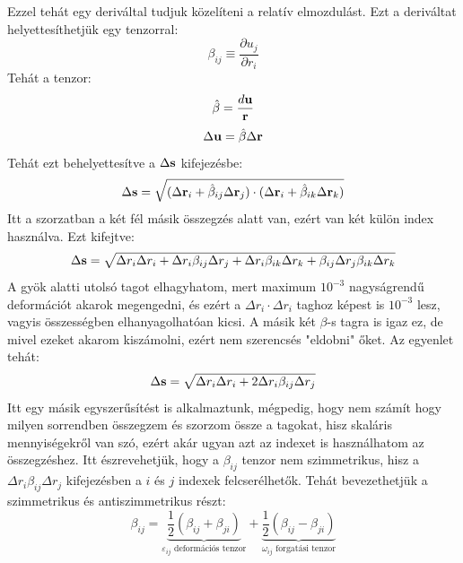 \documentclass[a4paper,12pt]{article}
\begin{document}
Ezzel tehát egy deriváltal tudjuk közelíteni a relatív elmozdulást. Ezt a deriváltat helyettesíthetjük egy tenzorral:
\begin{equation}
    \beta_{ij} \equiv \frac{\partial u_j}{\partial r_i}
\end{equation}
Tehát a tenzor:
\begin{equation}
    \hat{\beta} = \frac{d\bold{u}}{\bold{r}}
\end{equation}
\begin{equation}
    \Delta \bold{u} = \hat{\beta} \Delta \bold{r}
\end{equation}
Tehát ezt behelyettesítve a $\Delta \bold{s}$ kifejezésbe:
\begin{equation}
    \Delta \bold{s} = \sqrt{(\Delta \bold{r}_i + \hat{\beta}_{ij} \Delta \bold{r}_j) \cdot (\Delta \bold{r}_i + \hat{\beta}_{ik} \Delta \bold{r}_k)}
\end{equation}
Itt a szorzatban a két fél másik összegzés alatt van, ezért van két külön index használva. Ezt kifejtve:
\begin{equation}
    \Delta \bold{s} = \sqrt{\Delta r_i \Delta r_i + \Delta r_i \beta_{ij} \Delta r_j + \Delta r_i \beta_{ik} \Delta r_k + \beta_{ij} \Delta r_j \beta_{ik} \Delta r_k}
\end{equation}
A gyök alatti utolsó tagot elhagyhatom, mert maximum $10^{-3}$ nagyságrendű deformációt akarok megengedni, és ezért a $\Delta r_i \cdot \Delta r_i$ taghoz képest is
$10^{-3}$ lesz, vagyis összességben elhanyagolhatóan kicsi. A másik két $\beta$-s tagra is igaz ez, de mivel ezeket akarom kiszámolni, ezért nem szerencsés "eldobni" őket.
Az egyenlet tehát:
\begin{equation}
    \Delta \bold{s} = \sqrt{\Delta r_i \Delta r_i + 2 \Delta r_i \beta_{ij} \Delta r_j}
\end{equation}
Itt egy másik egyszerűsítést is alkalmaztunk, mégpedig, hogy nem számít hogy milyen sorrendben összegzem és szorzom össze a tagokat, hisz skaláris mennyiségekről van szó,
ezért akár ugyan azt az indexet is használhatom az összegzéshez. Itt észrevehetjük, hogy a $\beta_{ij}$ tenzor nem szimmetrikus, hisz a $\Delta r_i \beta_{ij} \Delta r_j$ kifejezésben a $i$ és $j$ indexek felcserélhetők. Tehát bevezethetjük a szimmetrikus és antiszimmetrikus részt:
\begin{equation}
    \beta_{ij} = \underbrace{\frac{1}{2} (\beta_{ij} + \beta_{ji})}_{\varepsilon_{ij} \text{ deformációs tenzor}} + \underbrace{\frac{1}{2} (\beta_{ij} - \beta_{ji})}_{\omega_{ij} \text{ forgatási tenzor}}
\end{equation}
\end{document}
